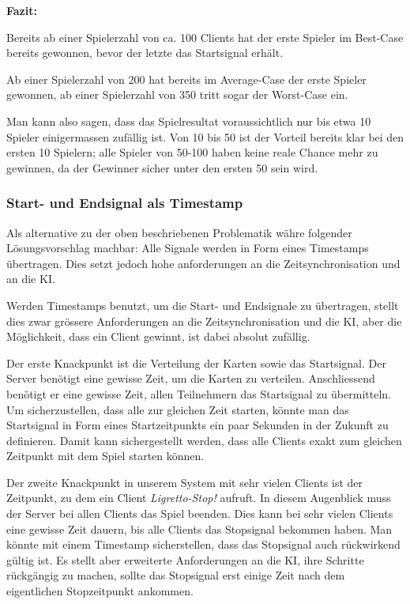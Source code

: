 \textbf{Fazit:}

Bereits ab einer Spielerzahl von ca. 100 Clients hat der erste Spieler im Best-Case bereits gewonnen, bevor der letzte das Startsignal erhält.

Ab einer Spielerzahl von 200 hat bereits im Average-Case der erste Spieler gewonnen, ab einer Spielerzahl von 350 tritt sogar der Worst-Case ein.

Man kann also sagen, dass das Spielresultat voraussichtlich nur bis etwa 10 Spieler einigermassen zufällig ist. Von 10 bis 50 ist der Vorteil bereits klar bei den ersten 10 Spielern; alle Spieler von 50-100 haben keine reale Chance mehr zu gewinnen, da der Gewinner sicher unter den ersten 50 sein wird. 

\subsubsection{Start- und Endsignal als Timestamp}

Als alternative zu der oben beschriebenen Problematik währe folgender Lösungsvorschlag machbar: Alle Signale werden in Form eines Timestamps übertragen. Dies setzt jedoch hohe anforderungen an die Zeitsynchronisation und an die KI.

Werden Timestamps benutzt, um die Start- und Endsignale zu übertragen, stellt dies zwar grössere Anforderungen an die Zeitsynchronisation und die KI, aber die Möglichkeit, dass ein Client gewinnt, ist dabei absolut zufällig.

Der erste Knackpunkt ist die Verteilung der Karten sowie das Startsignal. Der Server benötigt eine gewisse Zeit, um die Karten zu verteilen. Anschliessend benötigt er eine gewisse Zeit, allen Teilnehmern das Startsignal zu übermitteln. Um sicherzustellen, dass alle zur gleichen Zeit starten, könnte man das Startsignal in Form eines Startzeitpunkts ein paar Sekunden in der Zukunft zu definieren. Damit kann sichergestellt werden, dass alle Clients exakt zum gleichen Zeitpunkt mit dem Spiel starten können.


Der zweite Knackpunkt in unserem System mit sehr vielen Clients ist der Zeitpunkt, zu dem ein Client \textit{Ligretto-Stop!} aufruft. In diesem Augenblick muss der Server bei allen Clients das Spiel beenden. Dies kann bei sehr vielen Clients eine gewisse Zeit dauern, bis alle Clients das Stopsignal bekommen haben. Man könnte mit einem Timestamp sicherstellen, dass das Stopsignal auch rückwirkend gültig ist. Es stellt aber erweiterte Anforderungen an die KI, ihre Schritte rückgängig zu machen, sollte das Stopsignal erst einige Zeit nach dem eigentlichen Stopzeitpunkt ankommen.

